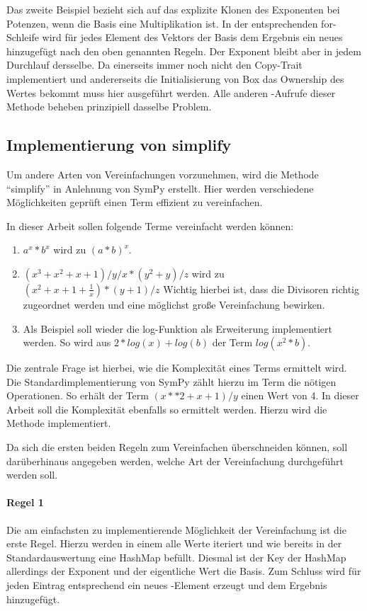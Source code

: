 \documentclass[11pt,a4paper, ngerman]{article}
\begin{document}
Das zweite Beispiel bezieht sich auf das explizite Klonen des Exponenten bei Potenzen, wenn die Basis eine Multiplikation ist. In der entsprechenden for-Schleife wird für jedes Element des Vektors der Basis dem Ergebnis ein neues hinzugefügt nach den oben genannten Regeln. Der Exponent bleibt aber in jedem Durchlauf dersselbe. Da  einerseits immer noch nicht den Copy-Trait implementiert und andererseits die Initialisierung von Box das Ownership des Wertes bekommt muss hier  ausgeführt werden. Alle anderen -Aufrufe dieser Methode beheben prinzipiell dasselbe Problem.

\subsection{Implementierung von simplify}
Um andere Arten von Vereinfachungen vorzunehmen, wird die Methode ``simplify'' in Anlehnung von SymPy \cite{SymPySimplify} erstellt. Hier werden verschiedene Möglichkeiten geprüft einen Term effizient zu vereinfachen.

In dieser Arbeit sollen folgende Terme vereinfacht werden können:

\begin{enumerate}
    \item $a^x * b^x$ wird zu $(a*b)^x$.
    \item $(x^3+x^2+x+1)/y/x*(y^2+y)/z$ wird zu $(x^2+x+1+\frac{1}{x})*(y+1)/z$ Wichtig hierbei ist, dass die Divisoren richtig zugeordnet werden und eine möglichst große Vereinfachung bewirken.
    \item Als Beispiel soll wieder die log-Funktion als Erweiterung implementiert werden. So wird aus $2*log(x)+log(b)$ der Term $log(x^2*b)$.
\end{enumerate}

Die zentrale Frage ist hierbei, wie die Komplexität eines Terms ermittelt wird. Die Standardimplementierung von SymPy zählt hierzu im Term die nötigen Operationen. So erhält der Term $(x**2+x+1)/y$ einen Wert von 4. In dieser Arbeit soll die Komplexität ebenfalls so ermittelt werden. Hierzu wird die Methode  implementiert.

Da sich die ersten beiden Regeln zum Vereinfachen überschneiden können, soll darüberhinaus angegeben werden, welche Art der Vereinfachung durchgeführt werden soll.

\paragraph{Regel 1} Die am einfachsten zu implementierende Möglichkeit der Vereinfachung ist die erste Regel. Hierzu werden in einem  alle Werte iteriert und wie bereits in der Standardauswertung eine HashMap befüllt. Diesmal ist der Key der HashMap allerdings der Exponent und der eigentliche Wert die Basis. Zum Schluss wird für jeden Eintrag entsprechend ein neues -Element erzeugt und dem Ergebnis hinzugefügt.
\end{document}
